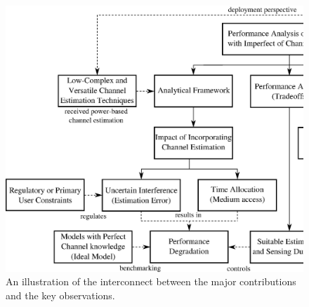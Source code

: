 \begin{figure}
        \centering
        \includegraphics[width=\textheight]{figures/Contri}
        \caption{An illustration of the interconnect between the major contributions and the key observations.}
        \label{fig:contri}
\end{figure}


